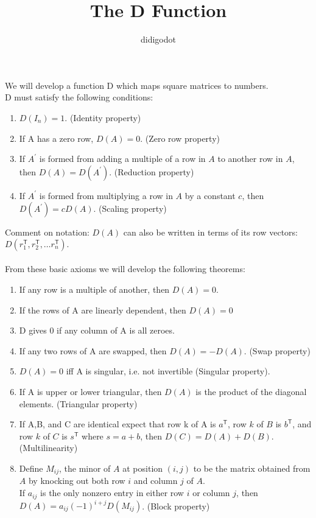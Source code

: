 \documentclass[11pt]{article} %
\title{The D Function}
\author{didigodot}
\begin{document}
\maketitle
We will develop a function D which maps square matrices to numbers.\\
D must satisfy the following conditions:
\begin{enumerate}
	\item $D(I_n)=1$. (Identity property)
	\item If A has a zero row, $D(A)=0$. (Zero row property)
	\item If $A^\prime$ is formed from adding a multiple of a row in $A$ to another row in $A$, then $D(A)=D(A^\prime)$. (Reduction property)
	\item If $A^\prime$ is formed from multiplying a row in $A$ by a constant $c$, then $D(A^\prime)=c D(A)$. (Scaling property)
\end{enumerate}
Comment on notation: $D(A)$ can also be written in terms of its row vectors: $D(r^{\mathsf{T}}_1,r^{\mathsf{T}}_2,\dots r^{\mathsf{T}}_n ).$\\ \\
From these basic axioms we will develop the following theorems:
\begin{enumerate}
	\item If any row is a multiple of another, then $D(A)=0$. 
	\item If the rows of A are linearly dependent, then $D(A) = 0$
	\item D gives 0 if any column of A is all zeroes.
	\item If any two rows of A are swapped, then $D(A)=-D(A)$. (Swap property)
	\item $D(A)=0$ iff A is singular, i.e. not invertible (Singular property).
	\item If A is upper or lower triangular, then $D(A)$ is the product of the diagonal elements. (Triangular property)
	\item If A,B, and C are identical expect that row k of A is $a^{\mathsf{T}}$, row $k$ of $B$ is $b^{\mathsf{T}}$, and row $k$ of $C$ is $s^{\mathsf{T}}$ where $s=a+b$, then $D(C)=D(A)+D(B)$. (Multilinearity)
	\item Define $M_{ij}$, the minor of $A$ at position $(i,j)$ to be the matrix obtained from $A$ by knocking out both row $i$ and column $j$ of $A$. \\If $a_{ij}$ is the only nonzero entry in either row $i$ or column $j$, then $D(A)=a_{ij}(-1)^{i+j}D(M_{ij})$. (Block property)
	
\end{enumerate}
\end{document}
